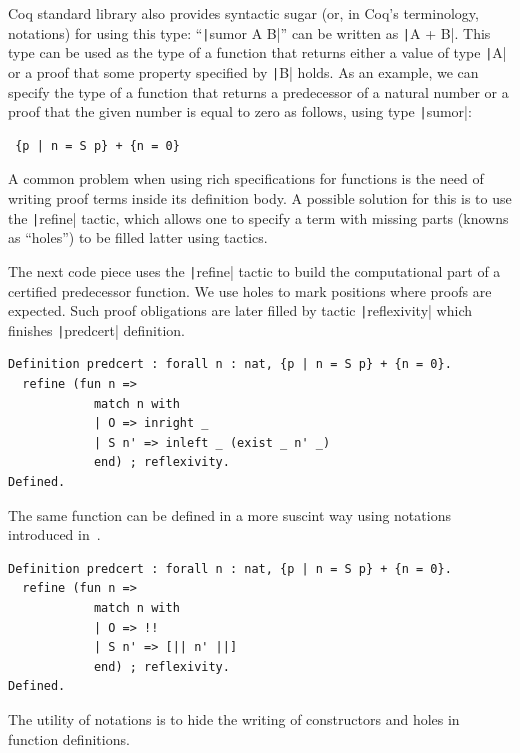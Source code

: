 \documentclass[review]{elsarticle}
\newcommand{\coq}[1]{\texttt|#1|}
\theoremstyle{definition}
\begin{document}
Coq standard library also provides syntactic sugar (or, in Coq's
terminology, notations) for using this type: ``\coq{sumor A B}'' can
be written as \coq{A + {B}}.
This type can be used as the type of a function that returns either a
value of type \coq{A} or a proof that some property specified by
\coq{B} holds.
As an example, we can specify the type of a function that returns a
predecessor of a natural number or a proof that the given number is
equal to zero as follows, using type \coq{sumor}:
\begin{verbatim}
 {p | n = S p} + {n = 0}
\end{verbatim}  
A common problem when using rich specifications for functions is the need
of writing proof terms inside its definition body. A possible solution for
this is to use the \coq{refine} tactic, which allows one to specify a term with
missing parts (knowns as ``holes'') to be filled latter using tactics.

The next code piece uses the \coq{refine} tactic to build the computational part
of a certified predecessor function. We use holes to mark positions where proofs are
expected. Such proof obligations are later filled by tactic \coq{reflexivity} which finishes
\coq{predcert} definition.

\begin{verbatim}
Definition predcert : forall n : nat, {p | n = S p} + {n = 0}.
  refine (fun n =>
            match n with
            | O => inright _
            | S n' => inleft _ (exist _ n' _)
            end) ; reflexivity.
Defined.
\end{verbatim}

The same function can be defined in a more suscint way using notations introduced
in~\cite{Chlipala13}.

\begin{verbatim}
Definition predcert : forall n : nat, {p | n = S p} + {n = 0}.
  refine (fun n =>
            match n with
            | O => !!
            | S n' => [|| n' ||]
            end) ; reflexivity.
Defined.
\end{verbatim}
The utility of notations is to hide the writing of constructors and holes in
function definitions.
\end{document}
